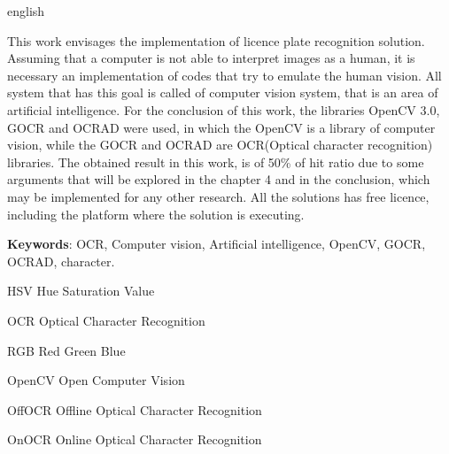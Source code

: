 \documentclass[12pt, oneside, a4paper, brazil]{abntex2}
\begin{document}
\begin{resumo}[Abstract]
 \begin{otherlanguage*}{english}
 
This work envisages the implementation of licence plate recognition solution. Assuming that a computer is not able to interpret images as a human, it is necessary an implementation of codes that try to emulate the human vision. All system that has this goal is called of computer vision system, that is an area of artificial intelligence. For the conclusion of this work, the libraries OpenCV 3.0, GOCR and OCRAD were used, in which the OpenCV is a library of computer vision, while the GOCR and OCRAD are OCR(Optical character recognition) libraries. The obtained result in this work, is of 50\% of hit ratio due to some arguments that will be explored in the chapter 4 and in the conclusion, which may be implemented for any other research. All the solutions has free licence, including the platform where the solution is executing.   \vspace{\onelineskip}
 
   \noindent 
   \textbf{Keywords}: OCR, Computer vision, Artificial intelligence, OpenCV, GOCR, OCRAD, character.
 \end{otherlanguage*}
\end{resumo}

\listoffigures
\cleardoublepage

\listoftables
\cleardoublepage

\lstlistoflistings
\cleardoublepage

\begin{siglas}
  \item[HSV] Hue Saturation Value
  \item[OCR] Optical Character Recognition
  \item[RGB] Red Green Blue
  \item[OpenCV] Open Computer Vision
  \item[OffOCR] Offline Optical Character Recognition
  \item[OnOCR] Online Optical Character Recognition
\end{siglas}


\tableofcontents*
\cleardoublepage


\textual
\end{document}
